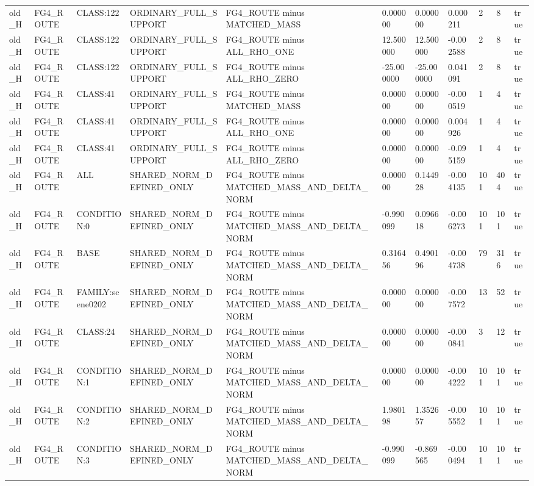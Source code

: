 \begin{tabular}{lllllllllll}
old\_H & FG4\_ROUTE & CLASS:122 & ORDINARY\_FULL\_SUPPORT & FG4\_ROUTE minus MATCHED\_MASS & 0.000000 & 0.000000 & 0.000211 & 2 & 8 & true \\
old\_H & FG4\_ROUTE & CLASS:122 & ORDINARY\_FULL\_SUPPORT & FG4\_ROUTE minus ALL\_RHO\_ONE & 12.500000 & 12.500000 & -0.002588 & 2 & 8 & true \\
old\_H & FG4\_ROUTE & CLASS:122 & ORDINARY\_FULL\_SUPPORT & FG4\_ROUTE minus ALL\_RHO\_ZERO & -25.000000 & -25.000000 & 0.041091 & 2 & 8 & true \\
old\_H & FG4\_ROUTE & CLASS:41 & ORDINARY\_FULL\_SUPPORT & FG4\_ROUTE minus MATCHED\_MASS & 0.000000 & 0.000000 & -0.000519 & 1 & 4 & true \\
old\_H & FG4\_ROUTE & CLASS:41 & ORDINARY\_FULL\_SUPPORT & FG4\_ROUTE minus ALL\_RHO\_ONE & 0.000000 & 0.000000 & 0.004926 & 1 & 4 & true \\
old\_H & FG4\_ROUTE & CLASS:41 & ORDINARY\_FULL\_SUPPORT & FG4\_ROUTE minus ALL\_RHO\_ZERO & 0.000000 & 0.000000 & -0.095159 & 1 & 4 & true \\
old\_H & FG4\_ROUTE & ALL & SHARED\_NORM\_DEFINED\_ONLY & FG4\_ROUTE minus MATCHED\_MASS\_AND\_DELTA\_NORM & 0.000000 & 0.144928 & -0.004135 & 101 & 404 & true \\
old\_H & FG4\_ROUTE & CONDITION:0 & SHARED\_NORM\_DEFINED\_ONLY & FG4\_ROUTE minus MATCHED\_MASS\_AND\_DELTA\_NORM & -0.990099 & 0.096618 & -0.006273 & 101 & 101 & true \\
old\_H & FG4\_ROUTE & BASE & SHARED\_NORM\_DEFINED\_ONLY & FG4\_ROUTE minus MATCHED\_MASS\_AND\_DELTA\_NORM & 0.316456 & 0.490196 & -0.004738 & 79 & 316 & true \\
old\_H & FG4\_ROUTE & FAMILY:scene0202 & SHARED\_NORM\_DEFINED\_ONLY & FG4\_ROUTE minus MATCHED\_MASS\_AND\_DELTA\_NORM & 0.000000 & 0.000000 & -0.007572 & 13 & 52 & true \\
old\_H & FG4\_ROUTE & CLASS:24 & SHARED\_NORM\_DEFINED\_ONLY & FG4\_ROUTE minus MATCHED\_MASS\_AND\_DELTA\_NORM & 0.000000 & 0.000000 & -0.000841 & 3 & 12 & true \\
old\_H & FG4\_ROUTE & CONDITION:1 & SHARED\_NORM\_DEFINED\_ONLY & FG4\_ROUTE minus MATCHED\_MASS\_AND\_DELTA\_NORM & 0.000000 & 0.000000 & -0.004222 & 101 & 101 & true \\
old\_H & FG4\_ROUTE & CONDITION:2 & SHARED\_NORM\_DEFINED\_ONLY & FG4\_ROUTE minus MATCHED\_MASS\_AND\_DELTA\_NORM & 1.980198 & 1.352657 & -0.005552 & 101 & 101 & true \\
old\_H & FG4\_ROUTE & CONDITION:3 & SHARED\_NORM\_DEFINED\_ONLY & FG4\_ROUTE minus MATCHED\_MASS\_AND\_DELTA\_NORM & -0.990099 & -0.869565 & -0.000494 & 101 & 101 & true \\

\end{tabular}
